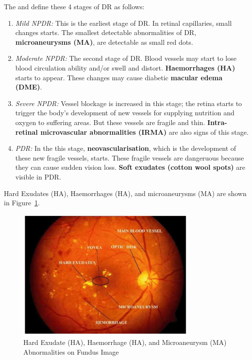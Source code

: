 The \citet{NationalEyeInstitute} and \citet{wilkinson2003proposed} define these 4 stages of DR as follows:
\begin{enumerate}
        \item \textit{Mild NPDR:} This is the earliest stage of DR. In retinal capillaries, small changes starts. The smallest detectable abnormalities of DR, \textbf{microaneurysms (MA)}, are detectable as small red dots.
        \item \textit{Moderate NPDR:} The second stage of DR. Blood vessels may start to lose blood circulation ability and/or swell and distort. \textbf{Haemorrhages (HA)} starts to appear. These changes may cause diabetic \textbf{macular edema (DME)}.
        \item \textit{Severe NPDR:} Vessel blockage is increased in this stage; the retina starts to trigger the body's development of new vessels for supplying nutrition and oxygen to suffering areas. But these vessels are fragile and thin. \textbf{Intra-retinal microvascular abnormalities (IRMA)} are also signs of this stage. 
        \item \textit{PDR:} In the this stage, \textbf{neovascularisation}, which is the development of these new fragile vessels, starts. These fragile vessels  are dangeruous because they can cause sudden vision loss. \textbf{Soft exudates (cotton wool spots)} are visible in PDR. 
\end{enumerate}

Hard Exudates (HA), Haemorrhages (HA), and microaneurysms (MA) are shown in Figure~\ref{AbnormalitiesFundusImage}.

\begin{figure}[t]
\centering
\includegraphics[width=0.8\textwidth]{Figures/retina_abnormalities}
\caption{Hard Exudate (HA), Haemorrhage (HA), and Microaneurysm (MA) Abnormalities on Fundus Image \citep[from][]{kekre2013hybrid}}
\label{AbnormalitiesFundusImage}
\end{figure}

